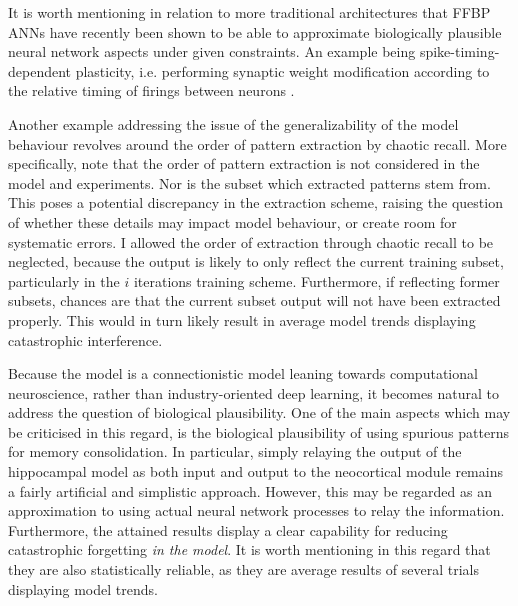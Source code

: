 It is worth mentioning in relation to more traditional architectures that FFBP ANNs have recently been shown to be able to approximate biologically plausible neural network aspects under given constraints. An example being spike-timing-dependent plasticity, i.e. performing synaptic weight modification according to the relative timing of firings between neurons \citep{Bengio2015}.

Another example addressing the issue of the generalizability of the model behaviour revolves around the order of pattern extraction by chaotic recall. More specifically, note that the order of pattern extraction is not considered in the model and experiments. Nor is the subset which extracted patterns stem from. This poses a potential discrepancy in the extraction scheme, raising the question of whether these details may impact model behaviour, or create room for systematic errors. 
I allowed the order of extraction through chaotic recall to be neglected, because the output is likely to only reflect the current training subset, particularly in the $i$ iterations training scheme. Furthermore, if reflecting former subsets, chances are that the current subset output will not have been extracted properly. This would in turn likely result in average model trends displaying catastrophic interference.

Because the model is a connectionistic model leaning towards computational neuroscience, rather than industry-oriented deep learning, it becomes natural to address the question of biological plausibility. One of the main aspects which may be criticised in this regard, is the biological plausibility of using spurious patterns for memory consolidation. In particular, simply relaying the output of the hippocampal model as both input and output to the neocortical module remains a fairly artificial and simplistic approach. However, this may be regarded as an approximation to using actual neural network processes to relay the information. Furthermore, the attained results display a clear capability for reducing catastrophic forgetting \textit{in the model}. It is worth mentioning in this regard that they are also statistically reliable, as they are average results of several trials displaying model trends.





